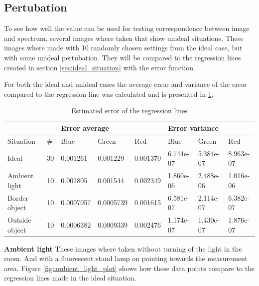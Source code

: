 \subsection{Pertubation}
To see how well the value can be used for testing correspondence between image and spectrum, several images where taken that show unideal situations. These images where made with 10 randomly chosen settings from the ideal case, but with some unideal pertubation. They will be compared to the regression lines created in section \ref{sec:ideal_situation} with the error function. 

For both the ideal and unideal cases the average error and variance of the error compared to the regression line was calculated and is presented in \ref{tb:error_estimate}.

\begin{table}[h]
    \centering
    \caption{Estimated error of the regression lines}
    \label{tb:error_estimate}
    \begin{tabular}{@{}llllllll@{}}
    \toprule
                   &                 & \multicolumn{3}{l}{Error average} & \multicolumn{3}{l}{Error variance} \\ \midrule
    Situation      & \#              & Blue       & Green     & Red      & Blue       & Green     & Red       \\
    Ideal          & 30              & 0.001261   & 0.001229  & 0.001370 & 6.744e-07  & 5.384e-07 & 8.963e-07 \\
    Ambient light  & 10              & 0.001805   & 0.001544  & 0.002349 & 1.860e-06  & 2.488e-06 & 1.016e-06 \\
    Border object  & 10              & 0.0007057  & 0.0005739 & 0.001615 & 6.581e-07  & 2.114e-07 & 6.382e-07 \\
    Outside object & 10              & 0.0006382  & 0.0009339 & 0.002476 & 1.174e-07  & 1.430e-07 & 1.876e-07 \\ \bottomrule
    \end{tabular}
\end{table}


\textbf{Ambient light}
These images where taken without turning of the light in the room. And with a fluorescent stand lamp on pointing towards the measurement area. Figure \ref{fig:ambient_light_plot} shows how these data points compare to the regression lines made in the ideal situation.

